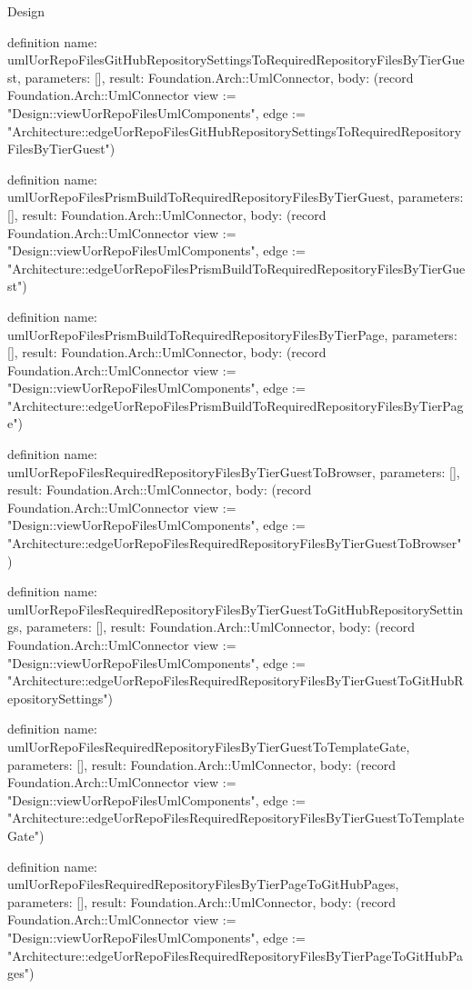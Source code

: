 \begin{lexlean}{Design}
\begin{semanticmodule}
definition{
  name: umlUorRepoFilesGitHubRepositorySettingsToRequiredRepositoryFilesByTierGuest,
  parameters: [],
  result: Foundation.Arch::UmlConnector,
  body: (record Foundation.Arch::UmlConnector {view := "Design::viewUorRepoFilesUmlComponents", edge := "Architecture::edgeUorRepoFilesGitHubRepositorySettingsToRequiredRepositoryFilesByTierGuest"})
}

definition{
  name: umlUorRepoFilesPrismBuildToRequiredRepositoryFilesByTierGuest,
  parameters: [],
  result: Foundation.Arch::UmlConnector,
  body: (record Foundation.Arch::UmlConnector {view := "Design::viewUorRepoFilesUmlComponents", edge := "Architecture::edgeUorRepoFilesPrismBuildToRequiredRepositoryFilesByTierGuest"})
}

definition{
  name: umlUorRepoFilesPrismBuildToRequiredRepositoryFilesByTierPage,
  parameters: [],
  result: Foundation.Arch::UmlConnector,
  body: (record Foundation.Arch::UmlConnector {view := "Design::viewUorRepoFilesUmlComponents", edge := "Architecture::edgeUorRepoFilesPrismBuildToRequiredRepositoryFilesByTierPage"})
}

definition{
  name: umlUorRepoFilesRequiredRepositoryFilesByTierGuestToBrowser,
  parameters: [],
  result: Foundation.Arch::UmlConnector,
  body: (record Foundation.Arch::UmlConnector {view := "Design::viewUorRepoFilesUmlComponents", edge := "Architecture::edgeUorRepoFilesRequiredRepositoryFilesByTierGuestToBrowser"})
}

definition{
  name: umlUorRepoFilesRequiredRepositoryFilesByTierGuestToGitHubRepositorySettings,
  parameters: [],
  result: Foundation.Arch::UmlConnector,
  body: (record Foundation.Arch::UmlConnector {view := "Design::viewUorRepoFilesUmlComponents", edge := "Architecture::edgeUorRepoFilesRequiredRepositoryFilesByTierGuestToGitHubRepositorySettings"})
}

definition{
  name: umlUorRepoFilesRequiredRepositoryFilesByTierGuestToTemplateGate,
  parameters: [],
  result: Foundation.Arch::UmlConnector,
  body: (record Foundation.Arch::UmlConnector {view := "Design::viewUorRepoFilesUmlComponents", edge := "Architecture::edgeUorRepoFilesRequiredRepositoryFilesByTierGuestToTemplateGate"})
}

definition{
  name: umlUorRepoFilesRequiredRepositoryFilesByTierPageToGitHubPages,
  parameters: [],
  result: Foundation.Arch::UmlConnector,
  body: (record Foundation.Arch::UmlConnector {view := "Design::viewUorRepoFilesUmlComponents", edge := "Architecture::edgeUorRepoFilesRequiredRepositoryFilesByTierPageToGitHubPages"})
}


\end{semanticmodule}
\end{lexlean}
